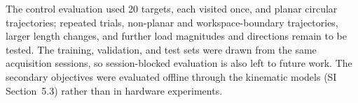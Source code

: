 The control evaluation used 20 targets, each visited once, and planar circular trajectories; repeated trials, non-planar and workspace-boundary trajectories, larger length changes, and further load magnitudes and directions remain to be tested. The training, validation, and test sets were drawn from the same acquisition sessions, so session-blocked evaluation is also left to future work. The secondary objectives were evaluated offline through the kinematic models (SI Section~5.3) rather than in hardware experiments.
